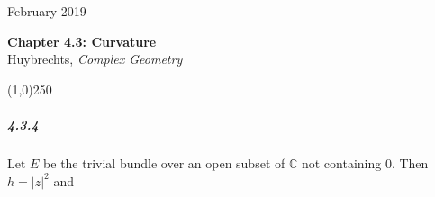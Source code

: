 \documentclass[10pt,letter]{article}
\begin{document}
\noindent 
February 2019
\begin{center}
\textbf{Chapter 4.3: Curvature}\\ Huybrechts, \textit{Complex Geometry}

\line(1,0){250}
\end{center}

\subparagraph{4.3.4} Let $E$ be the trivial bundle over an open subset of $\mathbb{C}$ not containing $0$. Then $h = \vert z \vert^2$ and 
\end{document}
